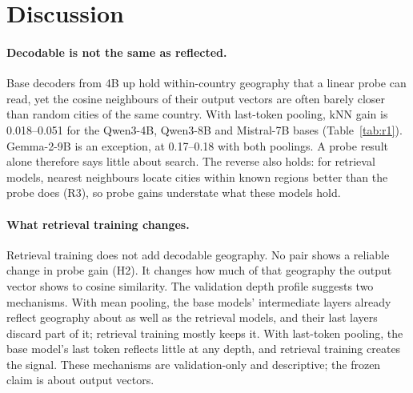 \section{Discussion}
\label{sec:discussion}

\paragraph{Decodable is not the same as reflected.}
Base decoders from 4B up hold within-country geography that a linear probe can read, yet the cosine neighbours of their output vectors are often barely closer than random cities of the same country. With last-token pooling, kNN gain is 0.018--0.051 for the Qwen3-4B, Qwen3-8B and Mistral-7B bases (Table~\ref{tab:r1}). Gemma-2-9B is an exception, at 0.17--0.18 with both poolings. A probe result alone therefore says little about search. The reverse also holds: for retrieval models, nearest neighbours locate cities within known regions better than the probe does (R3), so probe gains understate what these models hold.

\paragraph{What retrieval training changes.}
Retrieval training does not add decodable geography. No pair shows a reliable change in probe gain (H2). It changes how much of that geography the output vector shows to cosine similarity. The validation depth profile suggests two mechanisms. With mean pooling, the base models' intermediate layers already reflect geography about as well as the retrieval models, and their last layers discard part of it; retrieval training mostly keeps it. With last-token pooling, the base model's last token reflects little at any depth, and retrieval training creates the signal. These mechanisms are validation-only and descriptive; the frozen claim is about output vectors.

